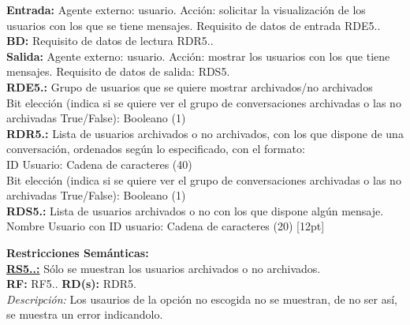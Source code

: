 \textbf{\textcolor{rojo}{Entrada:}} Agente externo: usuario. Acción: solicitar la visualización de los usuarios con los que se tiene mensajes. 
Requisito de datos de entrada \textcolor{azul}{RDE5.\theRDE}. \\[6pt]

\textbf{\textcolor{rojo}{BD:}} Requisito de datos de lectura \textcolor{azul}{RDR5.\theRDR}. \\[6pt]

\textbf{\textcolor{rojo}{Salida:}} Agente externo: usuario. Acción: mostrar los usuarios con los que tiene mensajes. 
Requisito de datos de salida: \textcolor{azul}{RDS5.\theRDS} \\[12pt]

\textcolor{azul}{\textbf{RDE5.\theRDE:}} Grupo de usuarios que se quiere mostrar archivados/no archivados\\
\hspace*{1cm} Bit elección (indica si se quiere ver el grupo de conversaciones archivadas o las no archivadas True/False): Booleano (1) \\[12pt]

\textcolor{azul}{\textbf{RDR5.\theRDR:}} Lista de usuarios archivados o no archivados, con los que dispone de una conversación, ordenados según lo especificado, con el formato:\\
\hspace*{1cm} ID Usuario: Cadena de caracteres (40) \\
\hspace*{1cm} Bit elección (indica si se quiere ver el grupo de conversaciones archivadas o las no archivadas True/False): Booleano (1) \\[12pt]

\textcolor{azul}{\textbf{RDS5.\theRDS:}} Lista de usuarios archivados o no con los que dispone algún mensaje. \\
\hspace*{1cm} Nombre Usuario con ID usuario: Cadena de caracteres (20) [12pt]

\setcounter{RS}{1}
\textbf{\textcolor{verde}{Restricciones Semánticas:}} \\[6pt]
\textbf{\textcolor{verde}{\underline{RS5.\theRF.\theRS:}}} Sólo se muestran los usuarios archivados o no archivados. \\
\textbf{RF:} RF5.\theRF. \textbf{RD(s):} RDR5.\theRDR \\
\hspace*{1cm} \textit{Descripción:} Los usaurios de la opción no escogida no se muestran, de no ser así, se muestra un error indicandolo. \\ [6pt]


